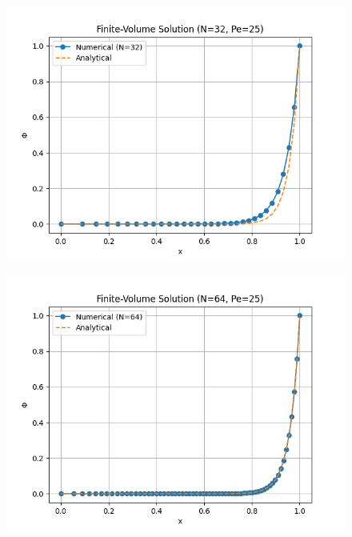\documentclass{article}
\begin{document}
\begin{figure}[H]
  \centering
  \begin{minipage}{0.32\textwidth}
      \centering
      \includegraphics[width=\textwidth]{FVM_32.png}
      \label{fig:32}
  \end{minipage} \hfill
  \begin{minipage}{0.32\textwidth}
      \centering
      \includegraphics[width=\textwidth]{FVM_64.png}
      \label{fig:64}
  \end{minipage} \hfill
  \begin{minipage}{0.32\textwidth}
      \centering

\end{minipage}
\end{figure}
\end{document}
